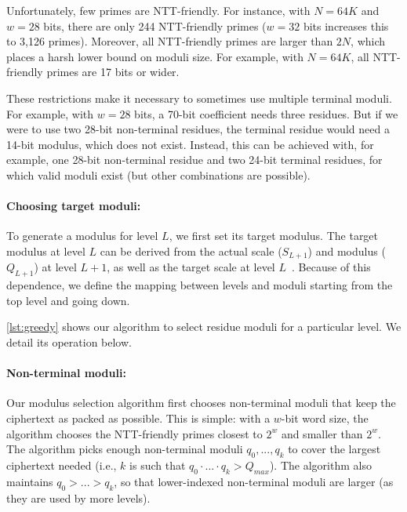 Unfortunately, few primes are NTT-friendly.
For instance, with $N=64K$ and $w=28$ bits, there are only 244 NTT-friendly
primes ($w=32$ bits increases this to 3,126 primes).
Moreover, all NTT-friendly primes are larger than $2N$,
which places a harsh
lower bound on moduli size.
For example, with $N=64K$, all NTT-friendly primes are 17 bits
or wider.

\figConstraints

These restrictions make it necessary to sometimes use multiple terminal moduli.
For example, with $w=28$ bits, a 70-bit coefficient needs three residues.
But if we were to use two 28-bit non-terminal residues, the terminal residue
would need a 14-bit modulus, which does not exist.
Instead, this can be achieved with, for example, one 28-bit non-terminal
residue and two 24-bit terminal residues, for which valid moduli exist (but
other combinations are possible).

\smallskip

\paragraph{Choosing target moduli:}
To generate  a modulus for level $L$, we first set its target modulus.
The target modulus at level $L$ can be derived from the actual scale ($S_{L+1}$) and
modulus ($Q_{L+1}$) at level $L+1$, as well as the target scale at level
$L$~\cite{kim2022approximate}.
Because of this dependence, we define the mapping between levels and moduli
starting from the top level and going down.

\autoref{lst:greedy} shows our algorithm to select residue moduli for a particular level.
We detail its operation below.

\paragraph{Non-terminal moduli:}
Our modulus selection algorithm first chooses non-terminal moduli that keep the
ciphertext as packed as possible. This is simple: with a $w$-bit word size, the
algorithm chooses the NTT-friendly primes closest to $2^w$ and smaller than
$2^w$.
The algorithm picks enough non-terminal moduli $q_0, ..., q_k$ to cover the
largest ciphertext needed (i.e., $k$ is such that $q_0 \cdot ... \cdot q_k >
Q_{max}$).
The algorithm also maintains $q_0 > ... > q_k$, so that lower-indexed
non-terminal moduli are larger (as they are used by more levels).


